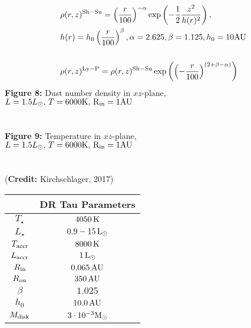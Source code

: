 \begin{equation}
\begin{split}
	    &\rho (r,z)^{\rm{Sh-Su}} = {\left(\frac{r}{100}\right)}^{-\alpha}\exp\left({-\frac{1}{2}{\frac{z^2}{h(r)^2}}}\right), \\
	    &h(r) = h_0 \left(\frac{r}{100}\right)^{\beta}, \alpha = 2.625, \beta=1.125, h_0 = 10 \rm{AU} \\
	    \\
	    &\rho (r,z)^{\rm{Ly-P}} = \rho (r,z)^{\rm{Sh-Su}}\exp\left({{\left(-\frac{r}{100}\right)}^{(2+\beta-\alpha)}}\right)
\end{split}
\end{equation}
%
\textbf{Figure 8:} Dust number density in $xz$-plane, \\
$L = 1.5 L_{\odot}, \, T = 6000 \rm{K}, \, R_{\rm{in}} = 1 \rm{AU}$ \\
\\
\\
%
\textbf{Figure 9:} Temperature in $xz$-plane, \\
$L = 1.5 L_{\odot}, \, T = 6000 \rm{K}, \, R_{\rm{in}} = 1 \rm{AU}$ \\
\\
\\

(\textbf{Credit: } Kirchschlager, 2017)

\begin{table}[h!]
	\begin{center}
 		\begin{tabular}{|c | c |} 
		\hline
		& DR Tau Parameters \\
		\hline
		$T_{\star}$ & $4050\, \rm{K}$\\		
		\hline
		$L_{\star}$ &  $0.9 -15\, \rm{L_{\odot}}$ \\
		\hline
		$T_{\rm{accr}}$ & $8000\, \rm{K}$\\		
		\hline
		$L_{\rm{accr}}$ &  $1\, \rm{L_{\odot}}$ \\
		\hline
		$R_{\rm{in}}$ & $0.065 \, \rm{AU}$\\
		\hline
		$R_{\rm{ou}}$ & $350 \, \rm{AU}$\\
		\hline
		$\beta$ & $1.025$\\
		\hline
		$h_0$ & $10.0 \, \rm{AU}$\\
		\hline
		$M_{\rm{disk}}$ & $ 3 \cdot 10^{-3}  \rm{M_{\odot}}$\\
		\hline
		\end{tabular}
	\end{center}
\end{table}


